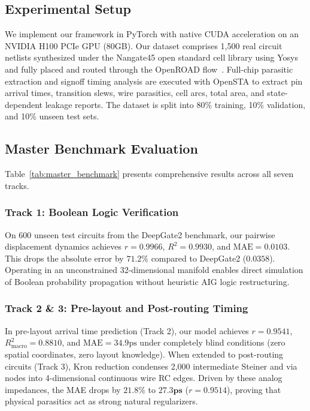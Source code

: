 \documentclass[conference]{IEEEtran}
\begin{document}
\subsection{Experimental Setup}
We implement our framework in PyTorch with native CUDA acceleration on an NVIDIA H100 PCIe GPU (80GB). Our dataset comprises 1,500 real circuit netlists synthesized under the Nangate45 open standard cell library using Yosys and fully placed and routed through the OpenROAD flow~\cite{openroad, circuitnet}. Full-chip parasitic extraction and signoff timing analysis are executed with OpenSTA to extract pin arrival times, transition slews, wire parasitics, cell arcs, total area, and state-dependent leakage reports. The dataset is split into 80\% training, 10\% validation, and 10\% unseen test sets.

\subsection{Master Benchmark Evaluation}
Table~\ref{tab:master_benchmark} presents comprehensive results across all seven tracks.

\subsubsection{Track 1: Boolean Logic Verification}
On 600 unseen test circuits from the DeepGate2 benchmark, our pairwise displacement dynamics achieves $r = 0.9966$, $R^2 = 0.9930$, and $\text{MAE} = 0.0103$. This drops the absolute error by $71.2\%$ compared to DeepGate2 ($0.0358$). Operating in an unconstrained 32-dimensional manifold enables direct simulation of Boolean probability propagation without heuristic AIG logic restructuring.

\subsubsection{Track 2 \& 3: Pre-layout and Post-routing Timing}
In pre-layout arrival time prediction (Track 2), our model achieves $r = 0.9541$, $R^2_{\text{macro}} = 0.8810$, and $\text{MAE} = 34.9\text{ps}$ under completely blind conditions (zero spatial coordinates, zero layout knowledge). When extended to post-routing circuits (Track 3), Kron reduction condenses 2,000 intermediate Steiner and via nodes into 4-dimensional continuous wire RC edges. Driven by these analog impedances, the MAE drops by $21.8\%$ to $\mathbf{27.3\text{ps}}$ ($r = 0.9514$), proving that physical parasitics act as strong natural regularizers.
\end{document}
